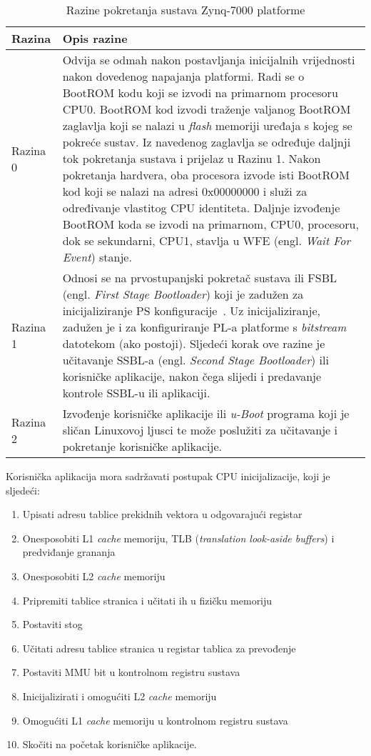 \documentclass[times, utf8, diplomski, numeric]{fer}
\begin{document}
\begin{table}[H]
  \centering
  \caption{Razine pokretanja sustava Zynq-7000 platforme}
  \label{boot_stages}
  \begin{tabular}{|| p{2cm} | p{12cm} ||}
    \hline
    \textbf{Razina} & \textbf{Opis razine} \\
    \hline\hline
    Razina 0 & Odvija se odmah nakon postavljanja inicijalnih vrijednosti nakon dovedenog napajanja platformi.
    Radi se o BootROM kodu koji se izvodi na primarnom procesoru CPU0. BootROM kod izvodi traženje valjanog
    BootROM zaglavlja koji se nalazi u \textit{flash} memoriji uređaja s kojeg se pokreće sustav. Iz navedenog
    zaglavlja se određuje daljnji tok pokretanja sustava i prijelaz u Razinu 1. Nakon pokretanja hardvera, oba
    procesora izvode isti BootROM kod koji se nalazi na adresi 0x00000000 i služi za određivanje vlastitog
    CPU identiteta. Daljnje izvođenje BootROM koda se izvodi na primarnom, CPU0, procesoru, dok se sekundarni, CPU1,
    stavlja u WFE (engl. \textit{Wait For Event}) stanje.\\
    \hline
    Razina 1 & Odnosi se na prvostupanjski pokretač sustava ili FSBL (engl. \textit{First Stage Bootloader}) koji
    je zadužen za inicijaliziranje PS konfiguracije~\cite{zynq_swdg}. Uz inicijaliziranje, zadužen je i za konfiguriranje PL-a
    platforme s \textit{bitstream} datotekom (ako postoji). Sljedeći korak ove razine je učitavanje SSBL-a (engl.
    \textit{Second Stage Bootloader}) ili korisničke aplikacije, nakon čega slijedi i predavanje kontrole SSBL-u
    ili aplikaciji.\\
    \hline
    Razina 2 & Izvođenje korisničke aplikacije ili \textit{u-Boot} programa koji je sličan Linuxovoj ljusci te može
    poslužiti za učitavanje i pokretanje korisničke aplikacije.\\
    \hline
  \end{tabular}
\end{table}
\newpage
Korisnička aplikacija mora sadržavati postupak CPU inicijalizacije, koji je sljedeći:
\begin{enumerate}
  \item{Upisati adresu tablice prekidnih vektora u odgovarajući registar}
  \item{Onesposobiti L1 \textit{cache} memoriju, TLB (\textit{translation look-aside buffers}) i predviđanje grananja}
  \item{Onesposobiti L2 \textit{cache} memoriju}
  \item{Pripremiti tablice stranica i učitati ih u fizičku memoriju}
  \item{Postaviti stog}
  \item{Učitati adresu tablice stranica u registar tablica za prevođenje}
  \item{Postaviti MMU bit u kontrolnom registru sustava}
  \item{Inicijalizirati i omogućiti L2 \textit{cache} memoriju}
  \item{Omogućiti L1 \textit{cache} memoriju u kontrolnom registru sustava}
  \item{Skočiti na početak korisničke aplikacije.}
\end{enumerate}
\end{document}
